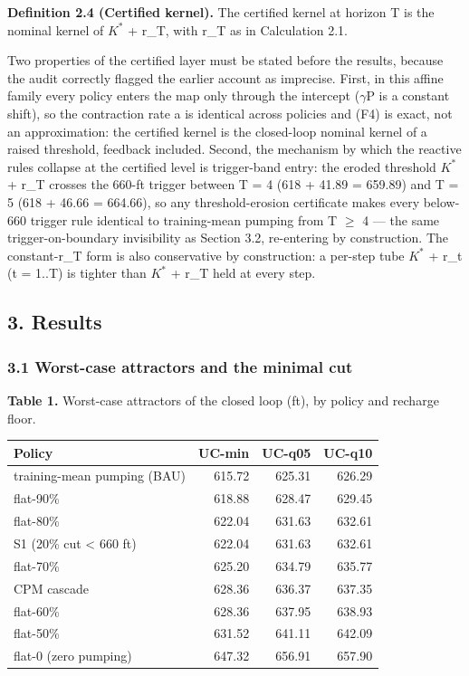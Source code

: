 \documentclass[11pt]{article}
\begin{document}
\textbf{Definition 2.4 (Certified kernel).} The certified kernel at
horizon T is the nominal kernel of \(K^{\ast}\) + r\_T, with r\_T as in
Calculation 2.1.

Two properties of the certified layer must be stated before the results,
because the audit correctly flagged the earlier account as imprecise.
First, in this affine family every policy enters the map only through
the intercept (\ensuremath{\gamma}P is a constant shift), so the contraction rate a is
identical across policies and (F4) is exact, not an approximation: the
certified kernel is the closed-loop nominal kernel of a raised
threshold, feedback included. Second, the mechanism by which the
reactive rules collapse at the certified level is trigger-band entry:
the eroded threshold \(K^{\ast}\) + r\_T crosses the 660-ft trigger
between T = 4 (618 + 41.89 = 659.89) and T = 5 (618 + 46.66 = 664.66),
so any threshold-erosion certificate makes every below-660 trigger rule
identical to training-mean pumping from T \ensuremath{\geq} 4 --- the same
trigger-on-boundary invisibility as Section 3.2, re-entering by
construction. The constant-r\_T form is also conservative by
construction: a per-step tube \(K^{\ast}\) + r\_t (t = 1..T) is tighter
than \(K^{\ast}\) + r\_T held at every step.

\subsection{3. Results}\label{results}

\subsubsection{3.1 Worst-case attractors and the minimal
cut}\label{worst-case-attractors-and-the-minimal-cut}

\textbf{Table 1.} Worst-case attractors of the closed loop (ft), by
policy and recharge floor.

\begin{longtable}[]{@{}lrrr@{}}
\toprule\noalign{}
Policy & UC-min & UC-q05 & UC-q10 \\
\midrule\noalign{}
\endhead
\bottomrule\noalign{}
\endlastfoot
training-mean pumping (BAU) & 615.72 & 625.31 & 626.29 \\
flat-90\% & 618.88 & 628.47 & 629.45 \\
flat-80\% & 622.04 & 631.63 & 632.61 \\
S1 (20\% cut \textless{} 660 ft) & 622.04 & 631.63 & 632.61 \\
flat-70\% & 625.20 & 634.79 & 635.77 \\
CPM cascade & 628.36 & 636.37 & 637.35 \\
flat-60\% & 628.36 & 637.95 & 638.93 \\
flat-50\% & 631.52 & 641.11 & 642.09 \\
flat-0 (zero pumping) & 647.32 & 656.91 & 657.90 \\
\end{longtable}
\end{document}
